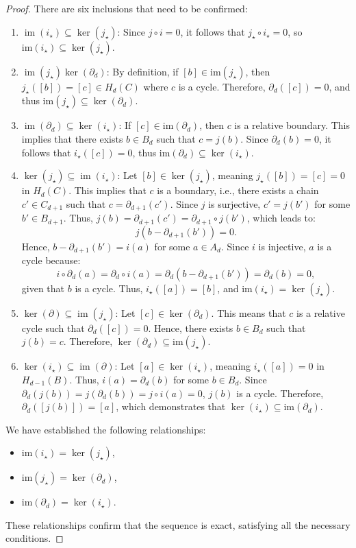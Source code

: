 \begin{proof}
There are six inclusions that need to be confirmed:
\begin{enumerate}
	\item $\operatorname{im}(i_\star) \subseteq \ker(j_\star)$: Since $j \circ i = 0$, it follows that $j_\star \circ i_\star = 0$, so $\mathrm{im}(i_\star) \subseteq \ker(j_\star)$.
	\item $\operatorname{im}(j_\star) \ker(\partial_d)$: By definition, if $[b] \in \mathrm{im}(j_\star)$, then $j_\star([b]) = [c] \in H_d(C)$ where $c$ is a cycle. Therefore, $\partial_d([c]) = 0$, and thus $\mathrm{im}(j_\star) \subseteq \ker(\partial_d)$.
	\item $\operatorname{im}(\partial_d) \subseteq \ker(i_\star)$: If $[c] \in \mathrm{im}(\partial_d)$, then $c$ is a relative boundary. This implies that there exists $b \in B_d$ such that $c = j(b)$. Since $\partial_d(b) = 0$, it follows that $i_\star([c]) = 0$, thus $\mathrm{im}(\partial_d) \subseteq \ker(i_\star)$.
	\item $\ker(j_\star) \subseteq \operatorname{im}(i_\star)$: Let $[b] \in \ker(j_\star)$, meaning $j_\star([b]) = [c] = 0$ in $H_d(C)$. This implies that $c$ is a boundary, i.e., there exists a chain $c' \in C_{d+1}$ such that $c = \partial_{d+1}(c')$. Since $j$ is surjective, $c' = j(b')$ for some $b' \in B_{d+1}$. Thus, $j(b) = \partial_{d+1}(c') = \partial_{d+1} \circ j(b')$, which leads to:
	\[
	j(b - \partial_{d+1}(b')) = 0.
	\]
	Hence, $b - \partial_{d+1}(b') = i(a)$ for some $a \in A_d$. Since $i$ is injective, $a$ is a cycle because:
	\[
	i \circ \partial_d(a) = \partial_d \circ i(a) = \partial_d(b - \partial_{d+1}(b')) = \partial_d(b) = 0,
	\]
	given that $b$ is a cycle. Thus, $i_\star([a]) = [b]$, and $\mathrm{im}(i_\star) = \ker(j_\star)$.
	\item $\ker(\partial) \subseteq \operatorname{im}(j_\star)$: Let $[c] \in \ker(\partial_d)$. This means that $c$ is a relative cycle such that $\partial_d([c]) = 0$. Hence, there exists $b \in B_d$ such that $j(b) = c$. Therefore, $\ker(\partial_d) \subseteq \mathrm{im}(j_\star)$.
	\item $\ker(i_\star) \subseteq \operatorname{im}(\partial)$: Let $[a] \in \ker(i_\star)$, meaning $i_\star([a]) = 0$ in $H_{d-1}(B)$. Thus, $i(a) = \partial_d(b)$ for some $b \in B_d$. Since $\partial_d(j(b)) = j(\partial_d(b)) = j \circ i(a) = 0$, $j(b)$ is a cycle. Therefore, $\partial_d([j(b)]) = [a]$, which demonstrates that $\ker(i_\star) \subseteq \mathrm{im}(\partial_d)$.
\end{enumerate}
We have established the following relationships:
\begin{itemize}
    \item $\mathrm{im}(i_\star) = \ker(j_\star)$,
    \item $\mathrm{im}(j_\star) = \ker(\partial_d)$,
    \item $\mathrm{im}(\partial_d) = \ker(i_\star)$.
\end{itemize}
These relationships confirm that the sequence is exact, satisfying all the necessary conditions.
\end{proof}

